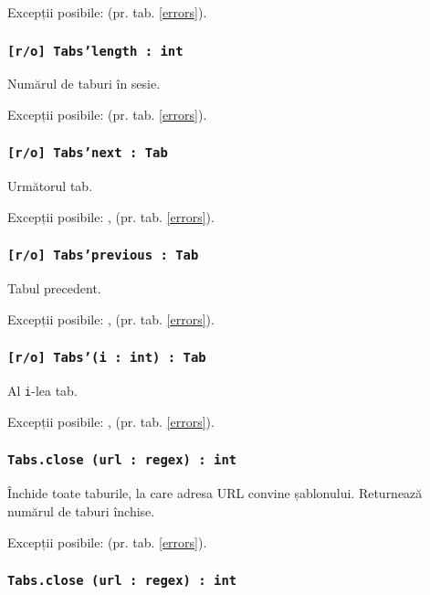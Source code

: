 Excepții posibile:  (pr. tab. \ref{errors}).

\subsubsection{\texttt{[r/o] Tabs'length : int}}

Numărul de taburi în sesie.

Excepții posibile:  (pr. tab. \ref{errors}).

\subsubsection{\texttt{[r/o] Tabs'next : Tab}}

Următorul tab.

Excepții posibile: ,  (pr. tab. \ref{errors}).

\subsubsection{\texttt{[r/o] Tabs'previous : Tab}}

Tabul precedent.

Excepții posibile: ,  (pr. tab. \ref{errors}).

\subsubsection{\texttt{[r/o] Tabs'(i : int) : Tab}}

Al \texttt{i}-lea tab.

Excepții posibile: ,  (pr. tab. \ref{errors}).

\subsubsection{\texttt{Tabs.close (url : regex) : int}}

Închide toate taburile, la care adresa URL convine șablonului. Returnează numărul de taburi închise.

Excepții posibile:  (pr. tab. \ref{errors}).

\subsubsection{\texttt{Tabs.close (url : regex) : int}}

